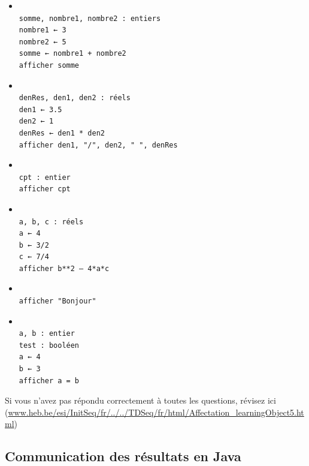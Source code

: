 \documentclass[11pt,a4paper]{article}
\begin{document}
            \begin{itemize} 
        
            \item[ \ding{"6F} ] \begin{verbatim}

somme, nombre1, nombre2 : entiers 
nombre1 ← 3 
nombre2 ← 5 
somme ← nombre1 + nombre2
afficher somme\end{verbatim}
        
            \item[ \ding{"6F} ] \begin{verbatim}

denRes, den1, den2 : réels 
den1 ← 3.5 
den2 ← 1 
denRes ← den1 * den2
afficher den1, "/", den2, " ", denRes \end{verbatim}
        
            \item[ \ding{"6F} ] \begin{verbatim}
						
cpt : entier 
afficher cpt\end{verbatim}
        
            \item[ \ding{"6F} ] \begin{verbatim}
						
a, b, c : réels 
a ← 4 
b ← 3/2 
c ← 7/4 
afficher b**2 – 4*a*c\end{verbatim}
        
            \item[ \ding{"6F} ] \begin{verbatim}
						
afficher "Bonjour"\end{verbatim}
        
            \item[ \ding{"6F} ] \begin{verbatim}
						
a, b : entier 
test : booléen 
a ← 4 
b ← 3 
afficher a = b\end{verbatim}
        
            \end{itemize} 
        Si vous n'avez pas r\'epondu correctement \`a toutes les questions, 
        r\'evisez ici (\url{www.heb.be/esi/InitSeq/fr/../../TDSeq/fr/html/Affectation\_learningObject5.html})
            \par
        \subsection{Communication des r\'esultats en Java}
			
\end{document}
